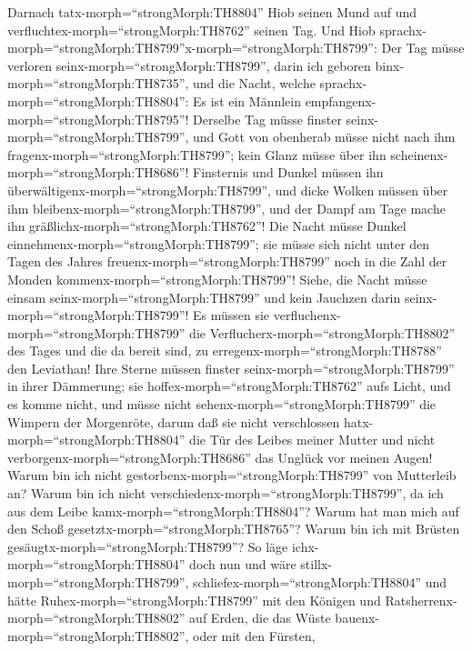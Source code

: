  Darnach tatx-morph=``strongMorph:TH8804'' Hiob seinen Mund
auf und verfluchtex-morph=``strongMorph:TH8762'' seinen Tag.
 Und Hiob
sprachx-morph=``strongMorph:TH8799''x-morph=``strongMorph:TH8799'':
 Der Tag müsse verloren seinx-morph=``strongMorph:TH8799'',
darin ich geboren binx-morph=``strongMorph:TH8735'', und die Nacht,
welche sprachx-morph=``strongMorph:TH8804'': Es ist ein Männlein
empfangenx-morph=``strongMorph:TH8795''!  Derselbe Tag müsse
finster seinx-morph=``strongMorph:TH8799'', und Gott von obenherab müsse
nicht nach ihm fragenx-morph=``strongMorph:TH8799''; kein Glanz müsse
über ihn scheinenx-morph=``strongMorph:TH8686''!  Finsternis
und Dunkel müssen ihn überwältigenx-morph=``strongMorph:TH8799'', und
dicke Wolken müssen über ihm bleibenx-morph=``strongMorph:TH8799'', und
der Dampf am Tage mache ihn gräßlichx-morph=``strongMorph:TH8762''!
 Die Nacht müsse Dunkel
einnehmenx-morph=``strongMorph:TH8799''; sie müsse sich nicht unter den
Tagen des Jahres freuenx-morph=``strongMorph:TH8799'' noch in die Zahl
der Monden kommenx-morph=``strongMorph:TH8799''!  Siehe, die
Nacht müsse einsam seinx-morph=``strongMorph:TH8799'' und kein Jauchzen
darin seinx-morph=``strongMorph:TH8799''!  Es müssen sie
verfluchenx-morph=``strongMorph:TH8799'' die
Verflucherx-morph=``strongMorph:TH8802'' des Tages und die da bereit
sind, zu erregenx-morph=``strongMorph:TH8788'' den Leviathan!
 Ihre Sterne müssen finster
seinx-morph=``strongMorph:TH8799'' in ihrer Dämmerung; sie
hoffex-morph=``strongMorph:TH8762'' aufs Licht, und es komme nicht, und
müsse nicht sehenx-morph=``strongMorph:TH8799'' die Wimpern der
Morgenröte,  darum daß sie nicht verschlossen
hatx-morph=``strongMorph:TH8804'' die Tür des Leibes meiner Mutter und
nicht verborgenx-morph=``strongMorph:TH8686'' das Unglück vor meinen
Augen!  Warum bin ich nicht
gestorbenx-morph=``strongMorph:TH8799'' von Mutterleib an? Warum bin ich
nicht verschiedenx-morph=``strongMorph:TH8799'', da ich aus dem Leibe
kamx-morph=``strongMorph:TH8804''?  Warum hat man mich auf
den Schoß gesetztx-morph=``strongMorph:TH8765''? Warum bin ich mit
Brüsten gesäugtx-morph=``strongMorph:TH8799''?  So läge
ichx-morph=``strongMorph:TH8804'' doch nun und wäre
stillx-morph=``strongMorph:TH8799'',
schliefex-morph=``strongMorph:TH8804'' und hätte
Ruhex-morph=``strongMorph:TH8799''  mit den Königen und
Ratsherrenx-morph=``strongMorph:TH8802'' auf Erden, die das Wüste
bauenx-morph=``strongMorph:TH8802'',  oder mit den Fürsten,

